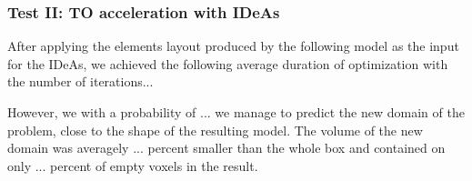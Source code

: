 \subsubsection{Test II: TO acceleration with IDeAs}

After applying the elements layout produced by the following model as the input for the IDeAs, we achieved the following average duration of optimization with the number of iterations...

However, we with a probability of ... we manage to predict the new domain of the problem, close to the shape of the resulting model. 
The volume of the new domain was averagely ... percent smaller than the whole box and contained on only ... percent of empty voxels in the result.
 


